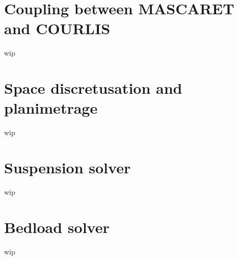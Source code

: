 \section{Coupling between MASCARET and COURLIS}
wip

\section{Space discretusation and planimetrage}
wip

\section{Suspension solver}
wip

\section{Bedload solver}
wip

